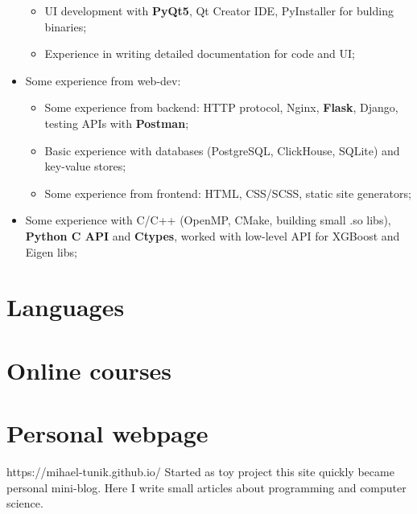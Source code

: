 \documentclass[12pt,a4paper,sans]{moderncv}
\begin{document}
\begin{itemize}
\begin{itemize}
        \item UI development with \textbf{PyQt5}, Qt Creator IDE, PyInstaller for bulding binaries; \newline
        \item Experience in writing detailed documentation for code and UI; \newline
    \end{itemize}
 \item Some experience from web-dev: \newline
    \begin{itemize}
        \item Some experience from backend: 
          HTTP protocol, Nginx, \textbf{Flask}, Django, testing APIs with \textbf{Postman};\newline
        \item Basic experience with databases (PostgreSQL, ClickHouse, SQLite) and key-value stores;\newline
        \item Some experience from frontend: HTML, CSS/SCSS, static site generators; \newline
    \end{itemize}
 \item Some experience with C/C++ (OpenMP, CMake, building small .so libs), \textbf{Python C API} and \textbf{Ctypes}, worked with low-level API for XGBoost and Eigen libs; \newline \newline
 \end{itemize} 
\section{Languages}
\section{Online courses}
\newline\newline
{} 
\section{Personal webpage}
https://mihael-tunik.github.io/ \newline \newline
Started as toy project this site quickly became personal mini-blog.
Here I write small articles about programming and computer science.
\end{document}
